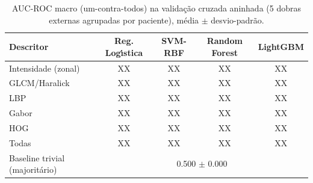 \begin{table}[ht]
\centering
\caption{AUC-ROC macro (um-contra-todos) na valida\c{c}\~ao cruzada aninhada (5 dobras externas agrupadas por paciente), m\'edia $\pm$ desvio-padr\~ao.}
\label{tab:main}
\small
\begin{tabular}{lcccc}
\hline
Descritor & Reg. Log\'{\i}stica & SVM-RBF & Random Forest & LightGBM \\
\hline
Intensidade (zonal) & XX & XX & XX & XX \\
GLCM/Haralick & XX & XX & XX & XX \\
LBP & XX & XX & XX & XX \\
Gabor & XX & XX & XX & XX \\
HOG & XX & XX & XX & XX \\
Todas & XX & XX & XX & XX \\
\hline
Baseline trivial (majorit\'ario) & \multicolumn{4}{c}{0.500 $\pm$ 0.000} \\
\hline
\end{tabular}
\end{table}
